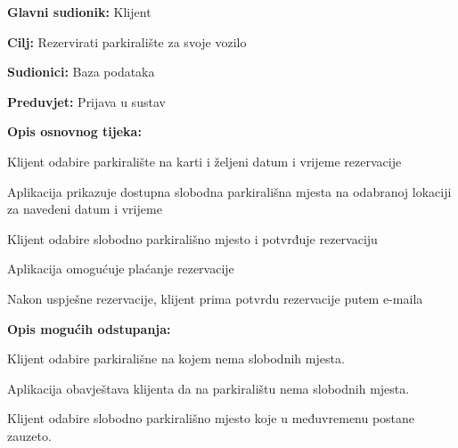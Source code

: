 {\begin{packed_item}
\begin{packed_item}
	\end{packed_item}
	
\end{packed_item}

\noindent {}
\begin{packed_item}
	
	\item \textbf{Glavni sudionik: }Klijent
	\item  \textbf{Cilj:} Rezervirati parkiralište za svoje vozilo
	\item  \textbf{Sudionici:} Baza podataka
	\item  \textbf{Preduvjet:} Prijava u sustav
	\item  \textbf{Opis osnovnog tijeka:}
	
	\item[] \begin{packed_enum}
		
		\item Klijent odabire parkiralište na karti i željeni datum i vrijeme rezervacije
		\item Aplikacija prikazuje dostupna slobodna parkirališna mjesta na odabranoj lokaciji za navedeni datum i vrijeme
		\item Klijent odabire slobodno parkirališno mjesto i potvrđuje rezervaciju
		\item Aplikacija omogućuje plaćanje rezervacije
		\item Nakon uspješne rezervacije, klijent prima potvrdu rezervacije putem e-maila
		
	\end{packed_enum}
	
	\item  \textbf{Opis mogućih odstupanja:}
	
	\item[] \begin{packed_item}
		
		\item[2.a] Klijent odabire parkirališne na kojem nema slobodnih mjesta.
		\item[] \begin{packed_enum}
			
			\item Aplikacija obavještava klijenta da na parkiralištu nema slobodnih mjesta.
			
		\end{packed_enum}
		
		\item[3.a] Klijent odabire slobodno parkirališno mjesto koje u međuvremenu postane zauzeto.
		\item[] \begin{packed_enum}
			

\end{packed_enum}
\end{packed_item}
\end{packed_item}}
